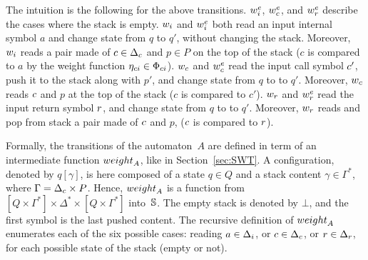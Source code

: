 \noindent
The intuition is the following for the above transitions.
$\weiei$, $\weiec$, and $\weier$ describe the cases where the stack is empty.
%
\noindent
$\weii$ and $\weiei$ both read an input internal symbol $a$ and change state from $q$ to $q'$,
without changing the stack.
Moreover, $\weii$ reads a pair made of
${\call{c}} \in \Deltac$ and $p \in P$ on the top of the stack
($c$ is compared to $a$ by the weight function $\eta_\mathsf{ci} \in \Phici$).
%
\noindent
$\weic$ and $\weiec$ read the input call symbol $c'$,
push it to the stack along with $p'$, and change state from $q$ to to $q'$.
Moreover, $\weic$ reads ${c}$ and $p$ at the top of the stack
($c$ is compared to $c'$).
%
\noindent
$\weir$ and $\weier$ read the input return symbol $r$, and change state from $q$ to to $q'$.
Moreover, $\weir$ reads and pop from stack a pair made of $c$ and $p$,
($c$ is compared to $r$).

Formally, the transitions of the automaton~$A$ are defined
in term of %
an intermediate function $\weight_A$, like in Section~\ref{sec:SWT}.
A configuration, denoted by $q[\gamma]$,
is here composed of a state $q \in Q$
and a stack content $\gamma \in \Gamma^*$,
where $\Gamma = \Deltac \times P$.
Hence, $\weight_A$ is a function from
$[Q \times \Gamma^*] \times \Delta^* \times [Q \times \Gamma^*]$ into~$\mathbb{S}$.
The empty stack is denoted by $\bot$, and the first %
symbol is the last pushed content.
%
The recursive definition of $\weight_A$
enumerates each of the six possible cases: 
reading $a \in \Deltai$,
or $\call{c} \in \Deltac$, or $\return{r} \in \Deltar$,
for each possible state of the stack (empty or not).

